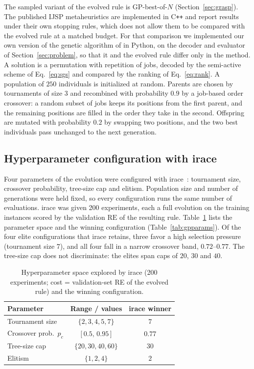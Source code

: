 \documentclass[review,authoryear,11pt]{elsarticle}
\newcommand{\RE}{\mathrm{RE}}
\begin{document}
The sampled variant of the evolved rule is GP-best-of-$N$
(Section~\ref{sec:grasp}). The published IJSP metaheuristics are
implemented in C\texttt{++} and report results under their own stopping
rules, which does not allow them to be compared with the evolved rule at
a matched budget. For that comparison we implemented our own version of
the genetic algorithm of \citet{DiazGA2020} in Python, on the decoder
and evaluator of Section~\ref{sec:problem}, so that it and the evolved
rule differ only in the method. A solution is a permutation with
repetition of jobs, decoded by the semi-active scheme of
Eq.~\eqref{eq:sgs} and compared by the ranking of Eq.~\eqref{eq:rank}.
A population of $250$ individuals is initialized at random. Parents are
chosen by tournaments of size $3$ and recombined with probability $0.9$
by a job-based order crossover: a random subset of jobs keeps its
positions from the first parent, and the remaining positions are filled
in the order they take in the second. Offspring are mutated with
probability $0.2$ by swapping two positions, and the two best
individuals pass unchanged to the next generation.

\subsection{Hyperparameter configuration with irace}
\label{sec:irace}
Four parameters of the evolution were configured with
irace~\citep{LopezIbanez2016}: tournament size, crossover probability,
tree-size cap and elitism. Population size and number of generations
were held fixed, so every configuration runs the same number of
evaluations. irace was given 200 experiments, each a full evolution on
the training instances scored by the validation $\RE$ of the resulting
rule. Table~\ref{tab:irace} lists the parameter space and the winning
configuration (Table~\ref{tab:gpparams}). Of the four elite
configurations that irace retains, three favor a high selection
pressure (tournament size $7$), and all four fall in a narrow crossover
band, $0.72$--$0.77$. The tree-size cap does not discriminate: the
elites span caps of $20$, $30$ and $40$.

\begin{table}[t]
\centering\small
\caption{Hyperparameter space explored by irace (200 experiments; cost =
validation-set RE of the evolved rule) and the winning configuration.}
\label{tab:irace}
\begin{tabular}{lcc}
\toprule
Parameter & Range / values & irace winner \\
\midrule
Tournament size & $\{2, 3, 4, 5, 7\}$ & $7$ \\
Crossover prob.\ $p_c$ & $[0.5,\, 0.95]$ & $0.77$ \\
Tree-size cap & $\{20, 30, 40, 60\}$ & $30$ \\
Elitism & $\{1, 2, 4\}$ & $2$ \\
\bottomrule
\end{tabular}
\end{table}
\end{document}
